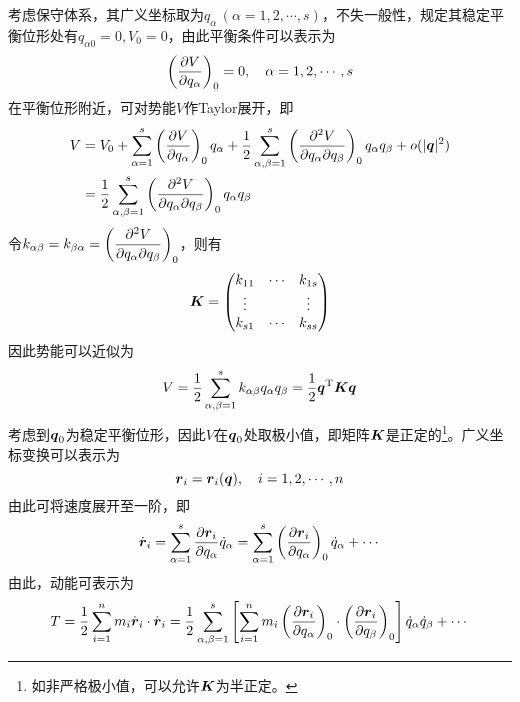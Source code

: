 考虑保守体系，其广义坐标取为$q_\alpha\,(\alpha=1,2,\cdots,s)$，不失一般性，规定其稳定平衡位形处有$q_{\alpha 0} = 0,V_0 = 0$，由此平衡条件可以表示为
\begin{equation*}
	\left(\frac{\partial V}{\partial q_\alpha}\right)_0 = 0,\quad \alpha = 1,2,\cdots,s
\end{equation*}
在平衡位形附近，可对势能$V$作Taylor展开，即
\begin{align*}
	V & = V_0 + \sum_{\alpha=1}^s \left(\dfrac{\partial V}{\partial q_\alpha}\right)_0 q_\alpha + \frac12 \sum_{\alpha,\beta=1}^s \left(\frac{\partial^2 V}{\partial q_\alpha \partial q_\beta}\right)_0 q_\alpha q_\beta + o(|\boldsymbol{q}|^2) \\
	& = \frac12 \sum_{\alpha,\beta=1}^s \left(\frac{\partial^2 V}{\partial q_\alpha \partial q_\beta}\right)_0 q_\alpha q_\beta
\end{align*}
令$k_{\alpha\beta} = k_{\beta\alpha} = \left(\dfrac{\partial^2 V}{\partial q_\alpha \partial q_\beta}\right)_0$，则有
\begin{equation*}
	\boldsymbol{K} = \begin{pmatrix} k_{11} & \cdots & k_{1s} \\ \vdots & & \vdots \\ k_{s1} & \cdots & k_{ss} \end{pmatrix}
\end{equation*}
因此势能可以近似为
\begin{equation}
	V = \frac12 \sum_{\alpha,\beta=1}^s k_{\alpha\beta}q_\alpha q_\beta = \frac12 \boldsymbol{q}^{\mathrm{T}} \boldsymbol{K} \boldsymbol{q}
\end{equation}
考虑到$\boldsymbol{q}_0$为稳定平衡位形，因此$V$在$\boldsymbol{q}_0$处取极小值，即矩阵$\boldsymbol{K}$是正定的\footnote{如非严格极小值，可以允许$\boldsymbol{K}$为半正定。}。广义坐标变换可以表示为
\begin{equation*}
	\boldsymbol{r}_i = \boldsymbol{r}_i(\boldsymbol{q}),\quad i=1,2,\cdots,n
\end{equation*}
由此可将速度展开至一阶，即
\begin{equation*}
	\dot{\boldsymbol{r}}_i = \sum_{\alpha=1}^s \frac{\partial \boldsymbol{r}_i}{\partial q_\alpha} \dot{q}_\alpha = \sum_{\alpha=1}^s \left(\frac{\partial \boldsymbol{r}_i}{\partial q_\alpha}\right)_0 \dot{q}_\alpha + \cdots
\end{equation*}
由此，动能可表示为
\begin{equation*}
	T = \frac12 \sum_{i=1}^n m_i \dot{\boldsymbol{r}}_i \cdot \dot{\boldsymbol{r}}_i = \frac12 \sum_{\alpha,\beta=1}^s \left[\sum_{i=1}^n m_i \left(\frac{\partial \boldsymbol{r}_i}{\partial q_\alpha}\right)_0 \cdot \left(\frac{\partial \boldsymbol{r}_i}{\partial q_\beta}\right)_0 \right] \dot{q}_\alpha \dot{q}_\beta + \cdots
\end{equation*}
